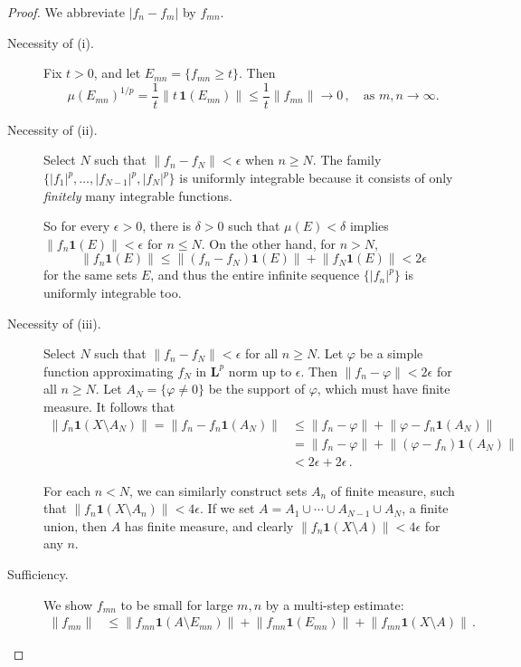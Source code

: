 \documentclass[12pt]{article}
\newcommand{\abs}[1]{\lvert#1\rvert}
\newcommand{\norm}[1]{\lVert#1\rVert}
\newcommand{\Le}{\mathbf{L}}
\newcommand{\indc}{\mathbf{1}}
\begin{document}
\begin{proof}
We abbreviate $\abs{f_n - f_m}$ by $f_{mn}$.

\begin{description}
\item[Necessity of (i).]
Fix $t > 0$, and let
$E_{mn} = \{ f_{mn} \geq t \}$.
Then
\[
\mu(E_{mn})^{1/p} = \frac{1}{t} \norm{ t \, \indc(E_{mn}) }
\leq \frac{1}{t} \norm{ f_{mn} } \to 0\,,
\quad
\text{as $m, n \to \infty$.}
\]

\item[Necessity of (ii).]
Select $N$ such that $\norm{f_n - f_N} < \epsilon$ when $n \geq N$.
The family $\{ \abs{f_1}^p, \dotsc, \abs{f_{N-1}}^p, \abs{f_N}^p \}$
is uniformly integrable
because it consists of only \emph{finitely} many integrable functions.

So for every $\epsilon > 0$, 
there is $\delta > 0$ such that $\mu(E) < \delta$
implies $\norm{f_n \indc(E)} < \epsilon$ for $n \leq N$.
On the other hand, for $n > N$,
\[
\norm{f_n \indc(E)} \leq \norm{ (f_n - f_N) \indc(E)} + \norm{f_N \indc(E)} < 2\epsilon
\]
for the same sets $E$,
and thus the entire infinite sequence $\{ \abs{f_n}^p \}$ is
uniformly integrable too.


\item[Necessity of (iii).]
Select $N$ such that $\norm{f_n - f_N} < \epsilon$
for all $n \geq N$.
Let $\varphi$ be a simple function approximating $f_N$ in $\Le^p$ norm up to $\epsilon$.
Then $\norm{f_n - \varphi} < 2\epsilon$ for all $n \geq N$.
Let $A_N = \{ \varphi \neq 0 \}$ be the support of $\varphi$, which must
have finite measure.
It follows that
\begin{align*}
\norm{f_n \indc(X \setminus A_N)} = \norm{f_n - f_n \indc(A_N)} 
&\leq \norm{f_n - \varphi} + \norm{\varphi - f_n \indc(A_N)} \\
&= \norm{f_n - \varphi} + \norm{(\varphi - f_n) \indc(A_N)} \\
&< 2\epsilon + 2\epsilon\,.
\end{align*}

For each $n < N$, we can similarly construct sets $A_n$
of finite measure, 
such that $\norm{f_n \indc(X \setminus A_n)} < 4\epsilon$.
If we set $A = A_1 \cup \dotsb \cup A_{N-1} \cup A_N$, a finite union,
then $A$ has finite measure, and clearly 
$\norm{f_n \indc(X \setminus A)} < 4\epsilon$ for any $n$.

\item[Sufficiency.]
We show $f_{mn}$ 
to be small for large $m,n$ by a multi-step estimate:
\begin{align*}
\norm{f_{mn}} 
&\leq 
\norm{f_{mn} \indc(A \setminus E_{mn})} + 
\norm{f_{mn} \indc(E_{mn})} +
\norm{f_{mn} \indc(X \setminus A)}\,.
\end{align*}


\end{description}
\end{proof}
\end{document}
